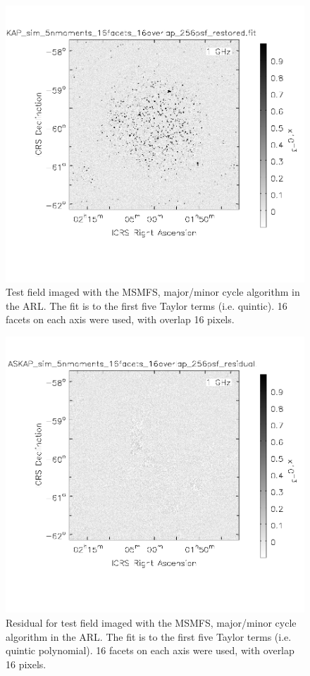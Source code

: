 \documentclass[11pt,a4paper,variablewidth]{article}
\begin{document}
\begin{figure}[h]
  \centering
  \includegraphics[width=\textwidth]{./pngs/ASKAP_sim_restored.png}
  \caption{Test field imaged with the MSMFS, major/minor cycle algorithm in the ARL. The fit is to the first five Taylor terms (i.e. quintic). 16 facets on each axis were used, with overlap 16 pixels.}
  \label{fig:ASKAP_sim_restored}
\end{figure}

\begin{figure}[h]
  \centering
  \includegraphics[width=\textwidth]{./pngs/ASKAP_sim_residual.png}
  \caption{Residual for test field imaged with the MSMFS, major/minor cycle algorithm in the ARL. The fit is to the first five Taylor terms (i.e. quintic polynomial). 16 facets on each axis were used, with overlap 16 pixels.}
  \label{fig:ASKAP_sim_residual}
\end{figure}
\end{document}
